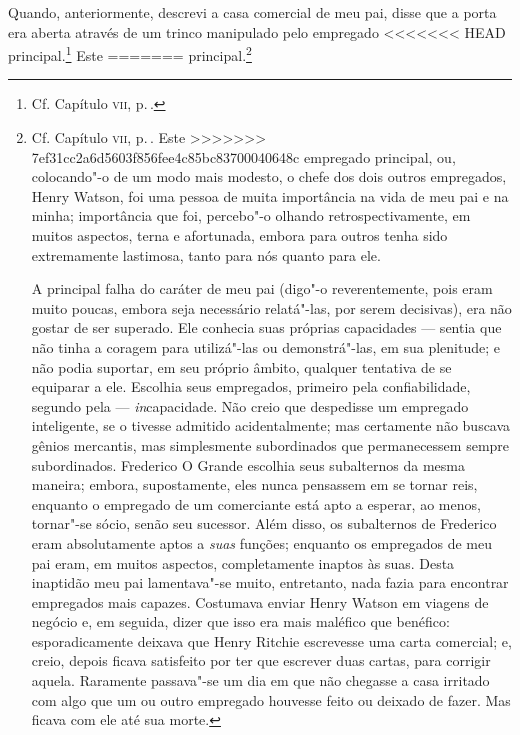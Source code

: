 {{{{{{{{{{{{{{{{{{{{{{{{{{{{{{{{{{{{{{{{{{{{{{{{{{{{{{{{{{{{{{{{{{{{{{Quando, anteriormente, descrevi a casa comercial de meu pai, disse que a
porta era aberta através de um trinco manipulado pelo empregado
<<<<<<< HEAD
principal.\footnote{Cf. Capítulo \textsc{vii}, p.\,\pageref{153}.} Este
=======
principal.\footnote{Cf. Capítulo \textsc{vii}, p.\,\pageref{153}.  Este
>>>>>>> 7ef31cc2a6d5603f856fee4c85bc83700040648c
empregado principal, ou, colocando"-o de um modo mais modesto, o chefe
dos dois outros empregados, Henry Watson, foi uma pessoa de muita
importância na vida de meu pai e na minha; importância que foi,
percebo"-o olhando retrospectivamente, em muitos aspectos, terna e
afortunada, embora para outros tenha sido extremamente lastimosa, tanto
para nós quanto para ele.

A principal falha do caráter de meu pai (digo"-o reverentemente, pois
eram muito poucas, embora seja necessário relatá"-las, por serem
decisivas), era não gostar de ser superado. Ele conhecia suas próprias
capacidades --- sentia que não tinha a coragem para utilizá"-las ou
demonstrá"-las, em sua plenitude; e não podia suportar, em seu próprio
âmbito, qualquer tentativa de se equiparar a ele. Escolhia seus
empregados, primeiro pela confiabilidade, segundo pela ---
\textit{in}capacidade. Não creio que despedisse um empregado inteligente,
se o tivesse admitido acidentalmente; mas certamente não buscava gênios
mercantis, mas simplesmente subordinados que permanecessem sempre
subordinados. Frederico O Grande escolhia seus subalternos da mesma
maneira; embora, supostamente, eles nunca pensassem em se tornar reis,
enquanto o empregado de um comerciante está apto a esperar, ao menos,
tornar"-se sócio, senão seu sucessor. Além disso, os subalternos de
Frederico eram absolutamente aptos a \textit{suas} funções; enquanto os
empregados de meu pai eram, em muitos aspectos, completamente inaptos às
suas. Desta inaptidão meu pai lamentava"-se muito, entretanto, nada fazia
para encontrar empregados mais capazes. Costumava enviar Henry Watson em
viagens de negócio e, em seguida, dizer que isso era mais maléfico que
benéfico: esporadicamente deixava que Henry Ritchie escrevesse uma carta
comercial; e, creio, depois ficava satisfeito por ter que escrever duas
cartas, para corrigir aquela. Raramente passava"-se um dia em que não
chegasse a casa irritado com algo que um ou outro empregado houvesse
feito ou deixado de fazer. Mas ficava com ele até sua morte.

}}}}}}}}}}}}}}}}}}}}}}}}}}}}}}}}}}}}}}}}}}}}}}}}}}}}}}}}}}}}}}}}}}}}}}}
